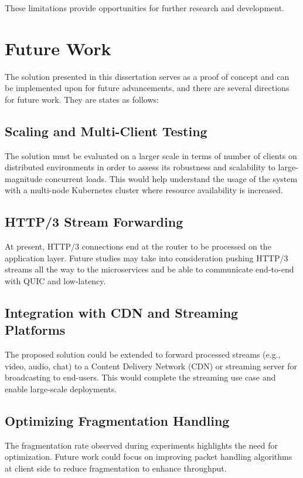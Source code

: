 These limitations provide opportunities for further research and development.

\section{Future Work}

The solution presented in this dissertation serves as a proof of concept and can be implemented upon for future advancements, and there are several directions for future work. They are states as follows:

\subsection{Scaling and Multi-Client Testing}
The solution must be evaluated on a larger scale in terms of number of clients on distributed environments in order to assess its robustness and scalability to large-magnitude concurrent loads. This would help understand the usage of the system with a multi-node Kubernetes cluster where resource availability is increased.

\subsection{HTTP/3 Stream Forwarding}
At present, HTTP/3 connections end at the router to be processed on the application layer. Future studies may take into consideration pushing HTTP/3 streams all the way to the microservices and be able to communicate end-to-end with QUIC and low-latency.

\subsection{Integration with CDN and Streaming Platforms}
The proposed solution could be extended to forward processed streams (e.g., video, audio, chat) to a Content Delivery Network (CDN) or streaming server for broadcasting to end-users. This would complete the streaming use case and enable large-scale deployments.

\subsection{Optimizing Fragmentation Handling}
The fragmentation rate observed during experiments highlights the need for optimization. Future work could focus on improving packet handling algorithms at client side to reduce fragmentation to enhance throughput.

